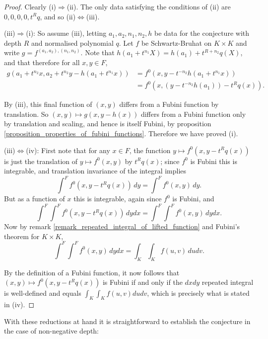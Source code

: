 \documentclass{lmsMODIFIED}
\begin{document}
\begin{proof}
Clearly (i)$\Rightarrow$(ii). The only data satisfying the conditions of (ii) are $0,0,0,0,t^Rq$, and so (ii)$\Leftrightarrow$(iii).

(iii)$\Rightarrow$(i): So assume (iii), letting $a_1,a_2,n_1,n_2,h$ be data for the conjecture with depth $R$ and normalised polynomial $q$. Let $f$ be Schwartz-Bruhat on $K\times K$ and write $g=f^{(a_1,a_2),(n_1,n_2)}$. Note that $h(a_1+t^{n_1}X)=h(a_1)+t^{R+n_2}q(X)$, and that therefore for all $x,y\in F$,
\begin{align*}
g(a_1+t^{n_2}x,a_2+t^{n_2}y-h(a_1+t^{n_1}x))
	&=f^0(x,y-t^{-n_2}h(a_1+t^{n_1}x))\\
	&=f^0(x,(y-t^{-n_2}h(a_1))-t^Rq(x)).
\end{align*}

By (iii), this final function of $(x,y)$ differs from a Fubini function by translation. So $(x,y)\mapsto g(x,y-h(x))$ differs from a Fubini function only by translation and scaling, and hence is itself Fubini, by proposition \ref{proposition_properties_of_fubini_functions}. Therefore we have proved (i).

(iii)$\Leftrightarrow$(iv): First note that for any $x\in F$, the function $y\mapsto f^0(x,y-t^Rq(x))$ is just the translation of $y\mapsto f^0(x,y)$ by $t^Rq(x)$; since $f^0$ is Fubini this is integrable, and translation invariance of the integral implies \[\int^F f^0(x,y-t^Rq(x))\,dy=\int^F f^0(x,y)\,dy.\] But as a function of $x$ this is integrable, again since $f^0$ is Fubini, and \[\int^F\int^F f^0(x,y-t^Rq(x))\,dydx=\int^F\int^F f^0(x,y)\,dydx.\] Now by remark \ref{remark_repeated_integral_of_lifted_function} and Fubini's theorem for $K\times K$, \[\int^F\int^F f^0(x,y)\,dydx=\int_K\int_K f(u,v)\,dudv.\]

By the definition of a Fubini function, it now follows that $(x,y)\mapsto f^0(x,y-t^Rq(x))$ is Fubini if and only if the $dxdy$ repeated integral is well-defined and equals $\int_K\int_K f(u,v)dudv$, which is precisely what is stated in (iv).
\end{proof}

With these reductions at hand it is straightforward to establish the conjecture in the case of non-negative depth:
\end{document}

